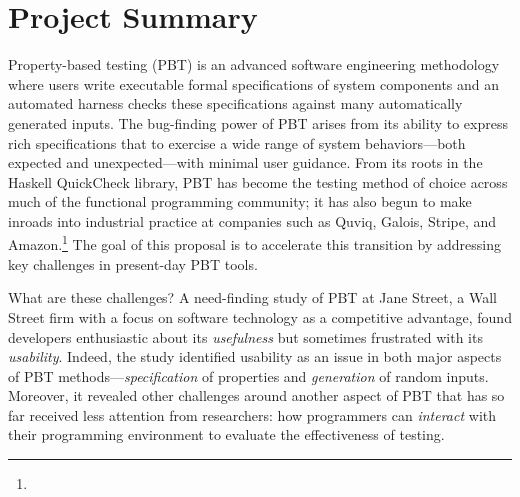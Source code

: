 \section*{Project Summary}


\newcommand{\summarysection}[1]{\medskip \noindent {\bf #1.} }

\summarysection{Overview}
Property-based testing (PBT) is an advanced software engineering
methodology where users write executable formal specifications of system
components
and an automated harness checks these specifications against
many automatically generated inputs.  The bug-finding power of PBT
arises from its ability to express rich specifications that
to exercise a wide range of system behaviors---both
expected and unexpected---with minimal user guidance.
%
From its roots in the Haskell QuickCheck library, PBT has become
the testing method of choice across much of the functional programming
community; it has also begun to make inroads into industrial practice
at companies such as Quviq, Galois, Stripe, and
Amazon.\footnote{\iflater{}\fi}
%
The goal of this proposal is to accelerate this transition
by addressing key challenges in
present-day PBT tools.

What are these challenges?\iflater{}\fi
A need-finding study of PBT at Jane
Street, a Wall Street firm with a focus on software
technology as a competitive advantage, found developers enthusiastic
about its {\em usefulness} but
sometimes frustrated with its {\em usability}.
%
Indeed, the study identified usability as an issue in both major aspects
of PBT methods---{\em specification} of properties and {\em
  generation} of random inputs. Moreover, it revealed other challenges
around another aspect of PBT that has so far received less attention from
researchers: how programmers can {\em interact} with their programming
environment to evaluate the
effectiveness of testing.

